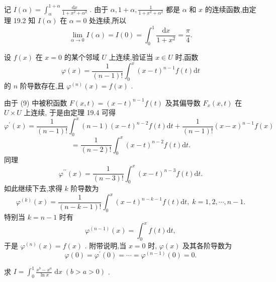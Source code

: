 \begin{solution}

\end{solution}
记 \(I\left( \alpha \right)  = {\int }_{\alpha }^{1 + \alpha }\frac{\mathrm{d}x}{1 + {x}^{2} + {\alpha }^{2}}\) . 由于 \(\alpha ,1 + \alpha ,\frac{1}{1 + {x}^{2} + {\alpha }^{2}}\) 都是 \(\alpha\) 和 \(x\) 的连续函数,由定理 19.2 知 \(I\left( \alpha \right)\) 在 \(\alpha  = 0\) 处连续,所以
\[
\mathop{\lim }\limits_{{\alpha  \rightarrow  0}}I\left( \alpha \right)  = I\left( 0\right)  = {\int }_{0}^{1}\frac{\mathrm{d}x}{1 + {x}^{2}} = \frac{\pi }{4}.
\]
\begin{example}

\end{example}
设 \(f\left( x\right)\) 在 \(x = 0\) 的某个邻域 \(U\) 上连续,验证当 \(x \in  U\) 时,函数
\[
\varphi \left( x\right)  = \frac{1}{\left( {n - 1}\right) !}{\int }_{0}^{x}{\left( x - t\right) }^{n - 1}f\left( t\right) \mathrm{d}t \tag{9}
\]
的 \(n\) 阶导数存在,且 \({\varphi }^{\left( n\right) }\left( x\right)  = f\left( x\right)\) .

\begin{solution}

\end{solution}
由于 (9) 中被积函数 \(F\left( {x,t}\right)  = {\left( x - t\right) }^{n - 1}f\left( t\right)\) 及其偏导数 \({F}_{x}\left( {x,t}\right)\) 在 \(U \times  U\) 上连续, 于是由定理 19.4 可得
\[
{\varphi }^{\prime }\left( x\right)  = \frac{1}{\left( {n - 1}\right) !}{\int }_{0}^{x}\left( {n - 1}\right) {\left( x - t\right) }^{n - 2}f\left( t\right) \mathrm{d}t + \frac{1}{\left( {n - 1}\right) !}{\left( x - x\right) }^{n - 1}f\left( x\right)
\]
\[
= \frac{1}{\left( {n - 2}\right) !}{\int }_{0}^{x}{\left( x - t\right) }^{n - 2}f\left( t\right) \mathrm{d}t.
\]
同理
\[
{\varphi }^{\prime \prime }\left( x\right)  = \frac{1}{\left( {n - 3}\right) !}{\int }_{0}^{x}{\left( x - t\right) }^{n - 3}f\left( t\right) \mathrm{d}t.
\]
如此继续下去,求得 \(k\) 阶导数为
\[
{\varphi }^{\left( k\right) }\left( x\right)  = \frac{1}{\left( {n - k - 1}\right) !}{\int }_{0}^{x}{\left( x - t\right) }^{n - k - 1}f\left( t\right) \mathrm{d}t,\;k = 1,2,\cdots ,n - 1.
\]
特别当 \(k = n - 1\) 时有
\[
{\varphi }^{\left( n - 1\right) }\left( x\right)  = {\int }_{0}^{x}f\left( t\right) \mathrm{d}t,
\]
于是 \({\varphi }^{\left( n\right) }\left( x\right)  = f\left( x\right)\) . 附带说明,当 \(x = 0\) 时, \(\varphi \left( x\right)\) 及其各阶导数为
\[
\varphi \left( 0\right)  = {\varphi }^{\prime }\left( 0\right)  = \cdots  = {\varphi }^{\left( n - 1\right) }\left( 0\right)  = 0.
\]
\begin{example}

\end{example}
求 \(I = {\int }_{0}^{1}\frac{{x}^{b} - {x}^{a}}{\ln x}\mathrm{\;d}x\;\left( {b > a > 0}\right)\) .

